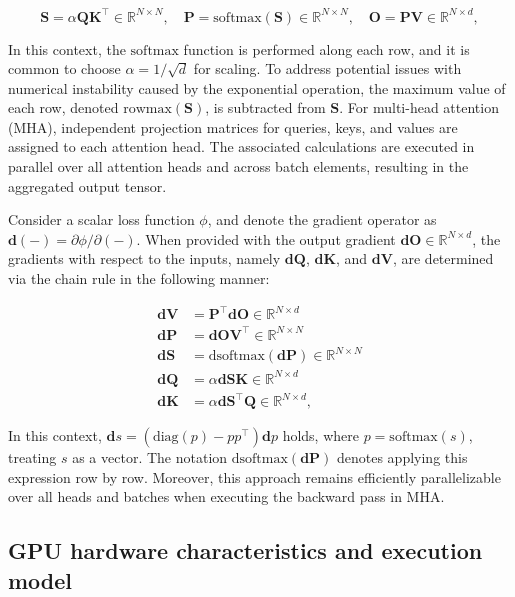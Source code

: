 \begin{equation*}
  \mathbf{S} = \alpha \mathbf{Q} \mathbf{K}^\top \in \mathbb{R}^{N \times N}, \quad \mathbf{P} = \mathrm{softmax}(\mathbf{S}) \in \mathbb{R}^{N \times N}, \quad \mathbf{O} = \mathbf{P}\mathbf{V} \in \mathbb{R}^{N \times d},
\end{equation*}

In this context, the $\mathrm{softmax}$ function is performed along each row, and it is common to choose $\alpha = 1/\sqrt{d}$ for scaling. To address potential issues with numerical instability caused by the exponential operation, the maximum value of each row, denoted $\mathrm{rowmax}(\mathbf{S})$, is subtracted from $\mathbf{S}$. For multi-head attention (MHA), independent projection matrices for queries, keys, and values are assigned to each attention head. The associated calculations are executed in parallel over all attention heads and across batch elements, resulting in the aggregated output tensor.

Consider a scalar loss function $\phi$, and denote the gradient operator as $\mathbf{d}(-) = \partial \phi / \partial (-)$. When provided with the output gradient $\mathbf{dO} \in \mathbb{R}^{N \times d}$, the gradients with respect to the inputs, namely $\mathbf{dQ}$, $\mathbf{dK}$, and $\mathbf{dV}$, are determined via the chain rule in the following manner:

\begin{align*}
  \mathbf{dV} &= \mathbf{P}^\top \mathbf{dO} \in \mathbb{R}^{N \times d} \\
  \mathbf{dP} &= \mathbf{dO} \mathbf{V}^\top \in \mathbb{R}^{N \times N} \\
  \mathbf{dS} &= \mathrm{dsoftmax} (\mathbf{dP}) \in \mathbb{R}^{N \times N} \\
  \mathbf{dQ} &= \alpha \mathbf{dS} \mathbf{K} \in \mathbb{R}^{N \times d} \\
  \mathbf{dK} &= \alpha \mathbf{dS}^\top \mathbf{Q} \in \mathbb{R}^{N \times d},
\end{align*}

In this context, $\mathbf{d}s = (\mathrm{diag}(p) - p p^\top)\mathbf{d}p$ holds, where $p = \mathrm{softmax}(s)$, treating $s$ as a vector. The notation $\mathrm{dsoftmax}(\mathbf{dP})$ denotes applying this expression row by row. Moreover, this approach remains efficiently parallelizable over all heads and batches when executing the backward pass in MHA.

\subsection{GPU hardware characteristics and execution model}
\label{subsec:hardware}

